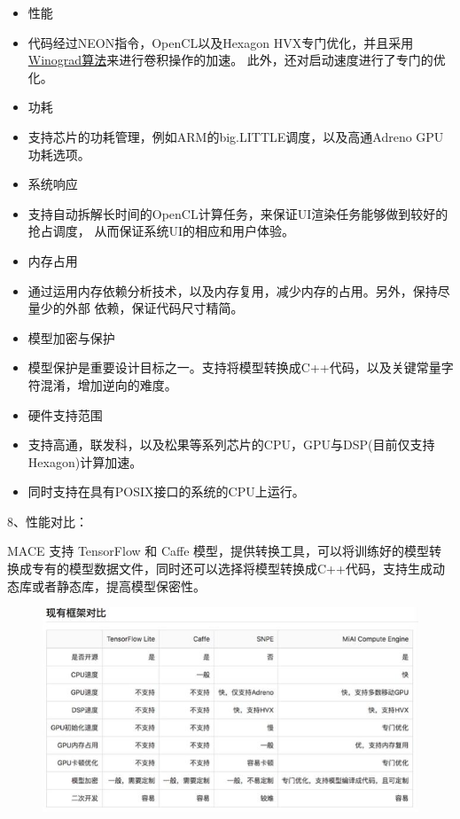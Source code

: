 \begin{itemize}
\item
  性能
\item
  代码经过NEON指令，OpenCL以及Hexagon HVX专门优化，并且采用
  \href{https://arxiv.org/abs/1509.09308}{Winograd算法}来进行卷积操作的加速。
  此外，还对启动速度进行了专门的优化。
\item
  功耗
\item
  支持芯片的功耗管理，例如ARM的big.LITTLE调度，以及高通Adreno
  GPU功耗选项。
\item
  系统响应
\item
  支持自动拆解长时间的OpenCL计算任务，来保证UI渲染任务能够做到较好的抢占调度，
  从而保证系统UI的相应和用户体验。
\item
  内存占用
\item
  通过运用内存依赖分析技术，以及内存复用，减少内存的占用。另外，保持尽量少的外部
  依赖，保证代码尺寸精简。
\item
  模型加密与保护
\item
  模型保护是重要设计目标之一。支持将模型转换成C++代码，以及关键常量字符混淆，增加逆向的难度。
\item
  硬件支持范围
\item
  支持高通，联发科，以及松果等系列芯片的CPU，GPU与DSP(目前仅支持Hexagon)计算加速。
\item
  同时支持在具有POSIX接口的系统的CPU上运行。
\end{itemize}

8、性能对比：

MACE 支持 TensorFlow 和 Caffe
模型，提供转换工具，可以将训练好的模型转换成专有的模型数据文件，同时还可以选择将模型转换成C++代码，支持生成动态库或者静态库，提高模型保密性。

\begin{figure}
\centering
\includegraphics{./img/ch17/maca_com.jpg}
\caption{}
\end{figure}

